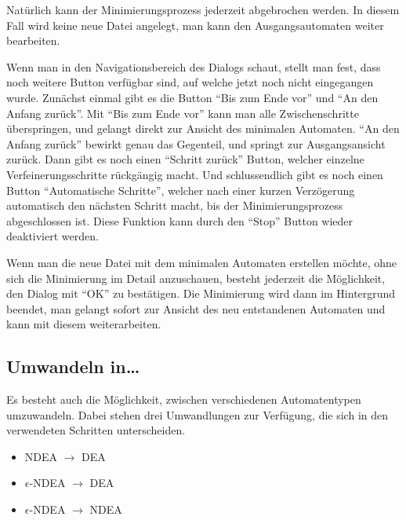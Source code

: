   Natürlich kann der Minimierungsprozess jederzeit abgebrochen werden. In diesem
  Fall wird keine neue Datei angelegt, man kann den Ausgangsautomaten weiter
  bearbeiten. \vspace{10pt}
  
  Wenn man in den Navigationsbereich des Dialogs schaut, stellt man fest, dass
  noch weitere Button verfügbar sind, auf welche jetzt noch nicht eingegangen
  wurde. Zunächst einmal gibt es die Button "`Bis zum Ende vor"' und "`An den
  Anfang zurück"'. Mit "`Bis zum Ende vor"' kann man alle Zwischenschritte
  überspringen, und gelangt direkt zur Ansicht des minimalen Automaten. "`An den
  Anfang zurück"' bewirkt genau das Gegenteil, und springt zur Ausgangsansicht
  zurück. Dann gibt es noch einen "`Schritt zurück"' Button, welcher einzelne
  Verfeinerungsschritte rückgängig macht. Und schlussendlich gibt es noch einen
  Button "`Automatische Schritte"', welcher nach einer kurzen Verzögerung
  automatisch den nächsten Schritt macht, bis der Minimierungsprozess
  abgeschlossen ist. Diese Funktion kann durch den "`Stop"' Button wieder
  deaktiviert werden.\vspace{10pt}
  
  Wenn man die neue Datei mit dem minimalen Automaten erstellen möchte, ohne sich
  die Minimierung im Detail anzuschauen, besteht jederzeit die Möglich\-keit,
  den Dialog mit "`OK"' zu bestätigen. Die Minimierung wird dann im Hintergrund
  beendet, man gelangt sofort zur Ansicht des neu entstandenen Automaten und
  kann mit diesem weiterarbeiten.
  
  
\subsection{Umwandeln in\ldots}\label{ConvertTo}
  
Es besteht auch die Möglichkeit, zwischen verschiedenen Automatentypen
umzuwandeln. Dabei stehen drei Umwandlungen zur Verfügung, die sich in den
verwendeten Schritten unterscheiden.

\begin{itemize}
  \item NDEA $\to$ DEA
  \item $\epsilon$-NDEA $\to$ DEA
  \item $\epsilon$-NDEA $\to$ NDEA
\end{itemize}


